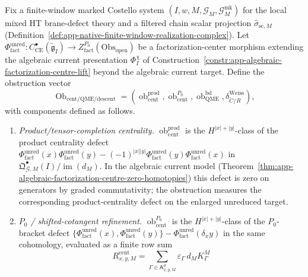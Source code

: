 \begin{thm}
\label{thm:app-unreduced-cotangent-lift-obstruction}
  Fix a finite-window marked Costello system
  \((I,w,M,\mathcal G_M,\mathcal G^{\mathrm{mk}}_M)\) for the local
  mixed HT brane-defect theory and a filtered chain scalar projection
  \(\widehat\sigma_{\mathrm{sc},M}\)
  (Definition~\ref{def:app-native-finite-window-realization-complex}).
  Let
  \(\Phi_{\mathrm{fact}}^{\mathrm{unred}}\colon
  C^\bullet_{\mathrm{CE}}(\widetilde{\mathfrak g}_I)
  \to
  Z^{P_0}_{\mathrm{fact}}(\mathrm{Obs}_{\mathrm{open}})\)
  be a factorization-center morphism extending the
  algebraic current presentation
  \(\Phi_I^\chi\) of
  Construction~\ref{constr:app-algebraic-factorization-centre-lift}
  beyond the algebraic current target.  Define the obstruction
  vector
  \[
    \operatorname{Ob}_{\mathrm{cent}/\mathrm{QME}/\mathrm{descent}}
      =
    (\operatorname{ob}^{\mathrm{prod}}_{\mathrm{cent}},
     \operatorname{ob}^{P_0}_{\mathrm{cent}},
     \operatorname{ob}^{\mathrm{bd}}_{\mathrm{QME}},
     \delta^{\mathrm{Weiss}}_{\check C/R}),
  \]
  with components defined as follows.
  \begin{enumerate}[label=(\roman*)]
    \item \emph{Product/tensor-completion centrality.}
      \(\operatorname{ob}^{\mathrm{prod}}_{\mathrm{cent}}\) is the
      \(H^{|x|+|y|}\)-class of the product centrality defect
      \(\Phi_{\mathrm{fact}}^{\mathrm{unred}}(x)\Phi_{\mathrm{fact}}^{\mathrm{unred}}(y)
      -(-1)^{|x||y|}\Phi_{\mathrm{fact}}^{\mathrm{unred}}(y)\Phi_{\mathrm{fact}}^{\mathrm{unred}}(x)\)
      in
      \(\mathfrak Q^\bullet_{\mathcal G,M}(I)/\operatorname{im}(d_M)\).
      In the algebraic current model
      (Theorem~\ref{thm:app-algebraic-factorization-centre-zero-homotopies})
      this defect is zero on generators by graded commutativity; the
      obstruction measures the corresponding product-centrality defect
      on the enlarged unreduced target.
    \item \emph{\(P_0\) / shifted-cotangent refinement.}
      \(\operatorname{ob}^{P_0}_{\mathrm{cent}}\) is the
      \(H^{|x|+|y|}\)-class of the \(P_0\)-bracket defect
      \(\{\Phi_{\mathrm{fact}}^{\mathrm{unred}}(x),\Phi_{\mathrm{fact}}^{\mathrm{unred}}(y)\}-
      \Phi_{\mathrm{fact}}^{\mathrm{unred}}(\delta_x y)\) in the same
      cohomology, evaluated as a finite row sum
      \[
        R^{\mathrm{cent}}_{x,y,M}
          =
        \sum_{\Gamma\in\mathsf A_{x,y,M}^{d}}
          \varepsilon_\Gamma\,d_M K^M_\Gamma
\]
\end{enumerate}
\end{thm}
